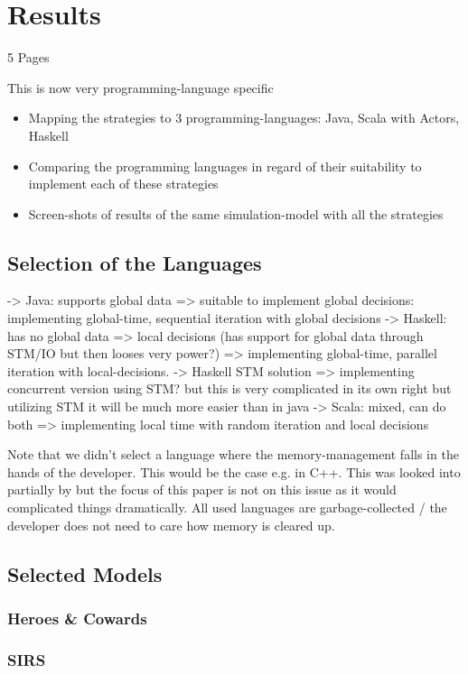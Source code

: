 \section{Results}
5 Pages

This is now very programming-language specific

\begin{itemize}
	\item Mapping the strategies to 3 programming-languages: Java, Scala with Actors, Haskell
	\item Comparing the programming languages in regard of their suitability to implement each of these strategies
	\item Screen-shots of results of the same simulation-model with all the strategies
\end{itemize}

\subsection{Selection of the Languages}
-> Java: supports global data => suitable to implement global decisions: implementing global-time, sequential iteration with global decisions
	-> Haskell: has no global data => local decisions (has support for global data through STM/IO but then looses very power?) => implementing global-time, parallel iteration with local-decisions. 
		-> Haskell STM solution => implementing concurrent version using STM? but this is very complicated in its own right but utilizing STM it will be much more easier than in java
	-> Scala: mixed, can do both => implementing local time with random iteration and local decisions


Note that we didn't select a language where the memory-management falls in the hands of the developer. This would be the case e.g. in C++. This was looked into partially by \cite{dawson_opening_2014} but the focus of this paper is not on this issue as it would complicated things dramatically. All used languages are garbage-collected / the developer does not need to care how memory is cleared up.

\subsection{Selected Models}

\subsubsection{Heroes \& Cowards}
\subsubsection{SIRS}
